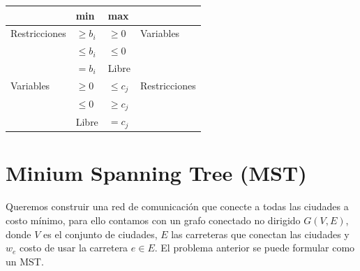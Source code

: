 \documentclass[10pt]{article}
\theoremstyle{plain}
\theoremstyle{definition}
\begin{document}
\begin{table}[h]
\begin{center}
\begin{tabular}{|l|l|l|l|}
\hline
                               & min          & max          &                                \\ \hline
\multirow{}{}{Restricciones} & $\geq b_{i}$ & $\geq 0$     & \multirow{}{}{Variables}     \\ \cline{2-3}
                               & $\leq b_{i}$ & $\leq 0$     &                                \\ \cline{2-3}
                               & $= b_{i}$    & Libre        &                                \\ \hline
\multirow{}{}{Variables}     & $\geq 0$     & $\leq c_{j}$ & \multirow{}{}{Restricciones} \\ \cline{2-3}
                               & $\leq 0$     & $\geq c_{j}$ &                                \\ \cline{2-3}
                               & Libre        & $= c_{j}$    &                                \\ \hline
\end{tabular}
\end{center}
\end{table}

\section{Minium Spanning Tree (MST)}
Queremos construir una red de comunicación que conecte a todas las ciudades a costo mínimo, para ello contamos con un grafo conectado no dirigido $G(V,E)$, donde $V$ es el conjunto de ciudades, $E$ las carreteras que conectan las ciudades y $w_{e}$ costo de usar la carretera $e \in E$. El problema anterior se puede formular como un MST.
\end{document}
